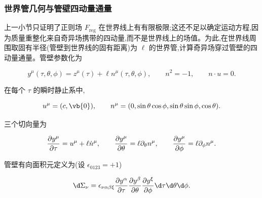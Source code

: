 
\subsubsection{世界管几何与管壁四动量通量}

上一小节只证明了正则场 $F_{\mathrm{reg}}$ 在世界线上有有限极限;这还不足以确定运动方程,因为质量重整化来自奇异场携带的四动量,而不是世界线上的场值。为此,在世界线周围取固有半径(管壁到世界线的固有距离)为 $\ell$ 的世界管,计算奇异场穿过管壁的四动量通量。管壁参数化为

\begin{equation*}
 y^\mu(\tau,\theta,\phi)
 =z^\mu(\tau)+\ell n^\mu(\tau,\theta,\phi),
 \qquad
 n^2=-1,
 \qquad
 n\cdot u=0.
\end{equation*}

在每个 $\tau$ 的瞬时静止系中,

\begin{equation*}
 u^\mu=(c,\vb{0}),
 \qquad
 n^\mu=(0,\sin\theta\cos\phi,\sin\theta\sin\phi,\cos\theta).
\end{equation*}

三个切向量为

\begin{equation*}
 {\partial y^\mu\over\partial\tau}=u^\mu+\ell\dot n^\mu,
 \qquad
 {\partial y^\mu\over\partial\theta}=\ell\partial_\theta n^\mu,
 \qquad
 {\partial y^\mu\over\partial\phi}=\ell\partial_\phi n^\mu.
\end{equation*}

管壁有向面积元定义为(设 $\epsilon_{0123}=+1$)

\begin{equation*}
 \d\Sigma_\nu
 =\epsilon_{\nu\alpha\beta\xi}
 {\partial y^\alpha\over\partial\tau}
 {\partial y^\beta\over\partial\theta}
 {\partial y^\xi\over\partial\phi}
 \d\tau\d\theta\d\phi.
\end{equation*}


